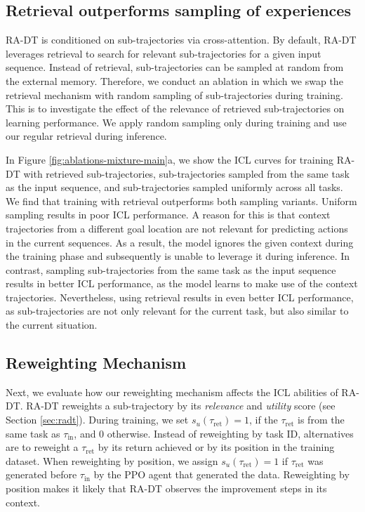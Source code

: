 \subsection{Retrieval outperforms sampling of experiences}
RA-DT is conditioned on sub-trajectories via cross-attention. 
By default, RA-DT leverages retrieval to search for relevant sub-trajectories for a given input sequence.
Instead of retrieval, sub-trajectories can be sampled at random from the external memory. Therefore, we conduct an ablation in which we swap the retrieval mechanism with random sampling of sub-trajectories during training.
This is to investigate the effect of the relevance of retrieved sub-trajectories on learning performance.
We apply random sampling only during training and use our regular retrieval during inference.

In Figure \ref{fig:ablations-mixture-main}a, 
we show the ICL curves for training RA-DT with retrieved sub-trajectories, sub-trajectories sampled from the same task as the input sequence, and sub-trajectories sampled uniformly across all tasks.
We find that training with retrieval outperforms both sampling variants. 
Uniform sampling results in poor ICL performance.
A reason for this is that context trajectories from a different goal location are not relevant for predicting actions in the current sequences. 
As a result, the model ignores the given context during the training phase and subsequently is unable to leverage it during inference. 
In contrast, sampling sub-trajectories from the same task as the input sequence results in better ICL performance, as the model learns to make use of the context trajectories.
Nevertheless, using retrieval results in even better ICL performance, as sub-trajectories are not only relevant for the current task, but also similar to the current situation. 

\subsection{Reweighting Mechanism}
Next, we evaluate how our reweighting mechanism affects the ICL abilities of RA-DT. 
RA-DT reweights a sub-trajectory by its \textit{relevance} and \textit{utility} score (see Section \ref{sec:radt}). 
During training, we set $s_{u}(\tau_{\text{ret}}) = 1$, if the $\tau_{\text{ret}}$ is from the same task as $\tau_{\text{in}}$, and 0 otherwise.
Instead of reweighting by task ID, alternatives are to reweight a $\tau_{\text{ret}}$ by its return achieved or by its position in the training dataset. 
When reweighting by position, we assign $s_{u}(\tau_{\text{ret}})=1$ if $\tau_{\text{ret}}$ was generated before $\tau_{\text{in}}$ by the PPO agent that generated the data.
Reweighting by position makes it likely that RA-DT observes the improvement steps in its context.


